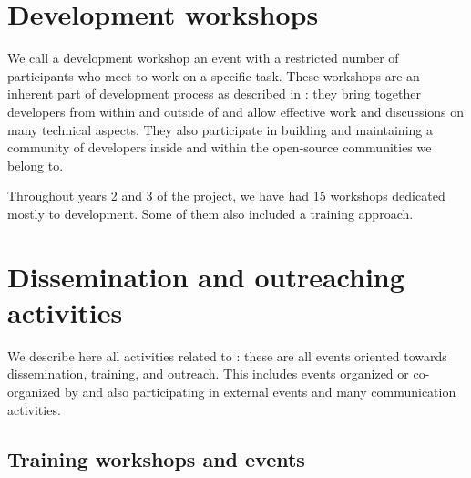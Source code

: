 \documentclass{deliverablereport}
\author{Viviane Pons et al.}
\begin{document}
\maketitle
\githubissuedescription
\newpage
\tableofcontents
\newpage

\section{Development workshops}

We call a development workshop an event with a restricted number of participants
who meet to work on a specific task. These workshops are an inherent part
of \ODK development process as described in :
 they bring together
developers from within and outside of \ODK and allow effective work
and discussions on many technical aspects. They also participate in building
and maintaining a community of developers inside \ODK and within the
open-source communities we belong to.

Throughout years 2 and 3 of the project, we have had 15 workshops dedicated mostly
to development. Some of them also included a training approach. 







\section{Dissemination and outreaching activities}


We describe here all activities related to :
these are all events oriented towards dissemination, training, and outreach. This
includes events organized or co-organized by \ODK and also
participating in external events and many communication activities.

\subsection{Training workshops and events}






\end{document}
